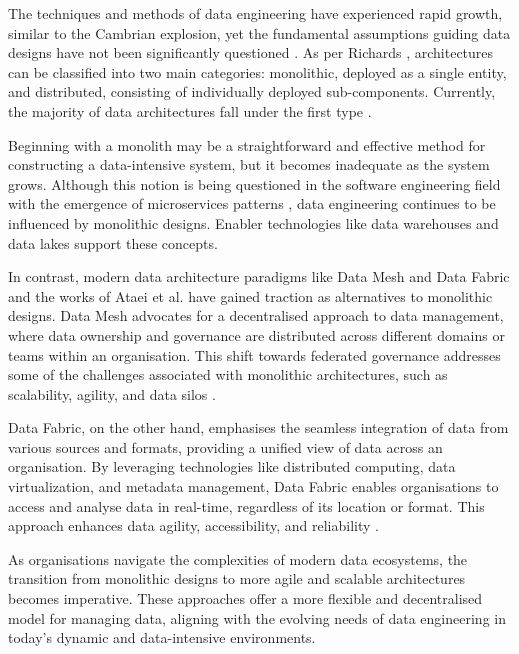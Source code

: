 \documentclass[preprint,12pt]{elsarticle}
\begin{document}
The techniques and methods of data engineering have experienced rapid growth, similar to the Cambrian explosion, yet the fundamental assumptions guiding data designs have not been significantly questioned \cite{DataMesh}. As per Richards \cite{richards2020fundamentals}, architectures can be classified into two main categories: monolithic, deployed as a single entity, and distributed, consisting of individually deployed sub-components. Currently, the majority of data architectures fall under the first type \cite{ataei2022state}. 

Beginning with a monolith may be a straightforward and effective method for constructing a data-intensive system, but it becomes inadequate as the system grows. Although this notion is being questioned in the software engineering field with the emergence of microservices patterns \cite{MicroServicesPatterns}, data engineering continues to be influenced by monolithic designs. Enabler technologies like data warehouses and data lakes support these concepts.

In contrast, modern data architecture paradigms like Data Mesh \cite{DataMesh} and Data Fabric \cite{GartnerDataFabric2023} and the works of Ataei et al. \cite{ataei2023towards} have gained traction as alternatives to monolithic designs. Data Mesh advocates for a decentralised approach to data management, where data ownership and governance are distributed across different domains or teams within an organisation. This shift towards federated governance addresses some of the challenges associated with monolithic architectures, such as scalability, agility, and data silos \cite{Bode2023}.

Data Fabric, on the other hand, emphasises the seamless integration of data from various sources and formats, providing a unified view of data across an organisation. By leveraging technologies like distributed computing, data virtualization, and metadata management, Data Fabric enables organisations to access and analyse data in real-time, regardless of its location or format. This approach enhances data agility, accessibility, and reliability \cite{Bode2023}.

As organisations navigate the complexities of modern data ecosystems, the transition from monolithic designs to more agile and scalable architectures becomes imperative. These approaches offer a more flexible and decentralised model for managing data, aligning with the evolving needs of data engineering in today's dynamic and data-intensive environments.
\end{document}
